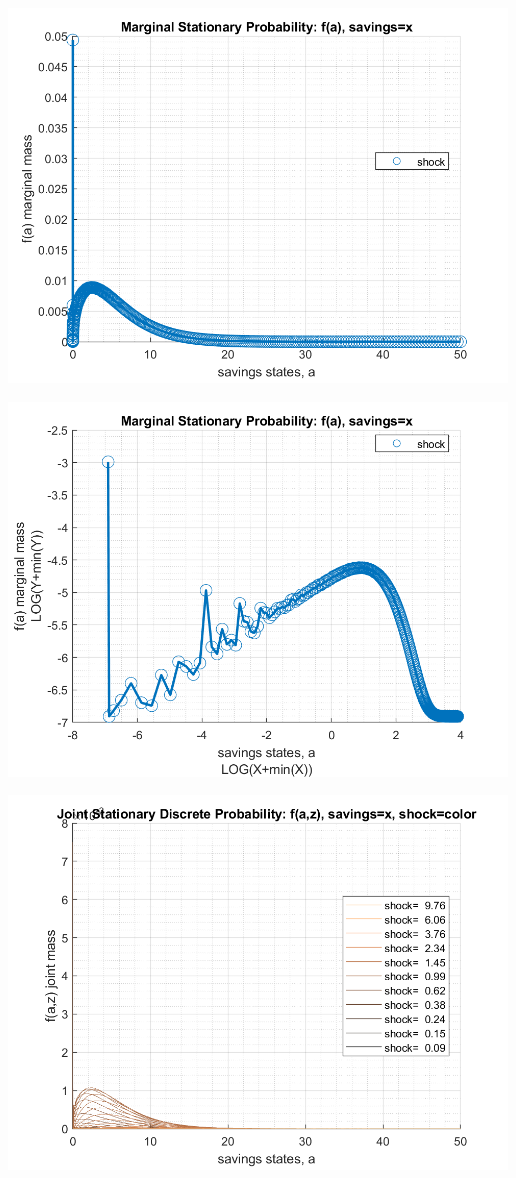 \documentclass[
]{book}
\begin{document}
\includegraphics[width=5.20833in,height=\textheight]{img/fx_ds_az_cts_vec_images/figure_12.png}

\includegraphics[width=5.20833in,height=\textheight]{img/fx_ds_az_cts_vec_images/figure_13.png}

\includegraphics[width=5.20833in,height=\textheight]{img/fx_ds_az_cts_vec_images/figure_14.png}
\end{document}
